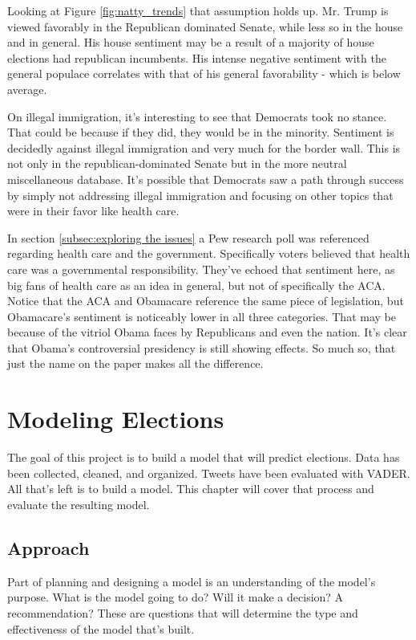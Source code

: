 \documentclass[11pt, twoside, reqno]{book}
\begin{document}
Looking at Figure \ref{fig:natty_trends} that assumption holds up. Mr. Trump is viewed favorably in the Republican dominated Senate, while less so in the house and in general. His house sentiment may be a result of a majority of house elections had republican incumbents. His intense negative sentiment with the general populace correlates with that of his general favorability - which is below average. 

On illegal immigration, it's interesting to see that Democrats took no stance. That could be because if they did, they would be in the minority. Sentiment is decidedly against illegal immigration and very much for the border wall. This is not only in the republican-dominated Senate but in the more neutral miscellaneous database. It's possible that Democrats saw a path through success by simply not addressing illegal immigration and focusing on other topics that were in their favor like health care. 

In section \ref{subsec:exploring the issues} a Pew research poll was referenced regarding health care and the government. Specifically voters believed that health care was a governmental responsibility. They've echoed that sentiment here, as big fans of health care as an idea in general, but not of specifically the ACA. Notice that the ACA and Obamacare reference the same piece of legislation, but Obamacare's sentiment is noticeably lower in all three categories. That may be because of the vitriol Obama faces by Republicans and even the nation. It's clear that Obama's controversial presidency is still showing effects. So much so, that just the name on the paper makes all the difference.  

\chapter{Modeling Elections}
\label{ch:modeling}
\hspace{0.2in}The goal of this project is to build a model that will predict elections. Data has been collected, cleaned, and organized. Tweets have been evaluated with VADER. All that's left is to build a model. This chapter will cover that process and evaluate the resulting model. 

\section{Approach}
\hspace{0.2in}Part of planning and designing a model is an understanding of the model's purpose. What is the model going to do? Will it make a decision? A recommendation? These are questions that will determine the type and effectiveness of the model that's built. 
\end{document}
